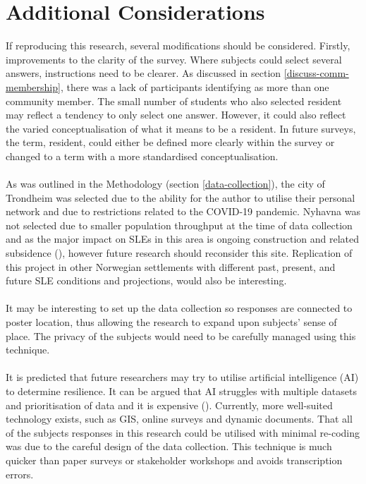 \section{Additional Considerations}
If reproducing this research, several modifications should be considered. Firstly, improvements to the clarity of the survey. Where subjects could select several answers, instructions need to be clearer. As discussed in section \ref{discuss-comm-membership}, there was a lack of participants identifying as more than one community member. The small number of students who also selected resident may reflect a tendency to only select one answer. However, it could also reflect the varied conceptualisation of what it means to be a resident. In future surveys, the term, resident, could either be defined more clearly within the survey or changed to a term with a more standardised conceptualisation.  
\paragraph{}
As was outlined in the Methodology (section \ref{data-collection}), the city of Trondheim was selected due to the ability for the author to utilise their personal network and due to restrictions related to the COVID-19 pandemic.  Nyhavna was not selected due to smaller population throughput at the time of data collection and as the major impact on SLEs in this area is ongoing construction and related subsidence (\cite{miljoenheten_og_byplankontoret_trondheim_kommune_9-notat-om-havnivastigning-og-stormflo---hensyn-i-arealplanlegging-nyhavnapdf_2020}), however future research should reconsider this site. Replication of this project in other Norwegian settlements with different past, present, and future SLE conditions and projections, would also be interesting. 

\paragraph{}
It may be interesting to set up the data collection so responses are connected to poster location, thus allowing the research to expand upon subjects' sense of place. The privacy of the subjects would need to be carefully managed using this technique. 
\paragraph{}
It is predicted that future researchers may try to utilise artificial intelligence (AI) to determine resilience. It can be argued that AI struggles with multiple datasets and prioritisation of data and it is expensive (\cite{shane_you_2019}). Currently, more well-suited technology exists, such as GIS, online surveys and dynamic documents. That all of the subjects responses in this research could be utilised with minimal re-coding was due to the careful design of the data collection. This technique is much quicker than paper surveys or stakeholder workshops and avoids transcription errors.
